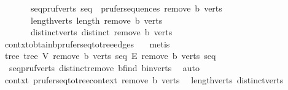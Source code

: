 \begin{isabellebody}
\ \ \ \ \ \ \ seq{\isacharunderscore}{\kern0pt}pruf{\isacharunderscore}{\kern0pt}verts{\isacharprime}{\kern0pt}{\isacharcolon}{\kern0pt}\ {\isachardoublequoteopen}seq\ {\isasymin}\ prufer{\isacharunderscore}{\kern0pt}sequences\ {\isacharparenleft}{\kern0pt}remove{}\ b\ verts{\isacharparenright}{\kern0pt}{\isachardoublequoteclose}\isanewline
\ \ \ \ \ \ \ length{\isacharunderscore}{\kern0pt}verts{\isacharprime}{\kern0pt}{\isacharcolon}{\kern0pt}\ {\isachardoublequoteopen}length\ {\isacharparenleft}{\kern0pt}remove{}\ b\ verts{\isacharparenright}{\kern0pt}\ {\isasymge}\ {}{\isachardoublequoteclose}\isanewline
\ \ \ \ \ \ \ distinct{\isacharunderscore}{\kern0pt}verts{\isacharprime}{\kern0pt}{\isacharcolon}{\kern0pt}\ {\isachardoublequoteopen}distinct\ {\isacharparenleft}{\kern0pt}remove{}\ b\ verts{\isacharparenright}{\kern0pt}{\isachardoublequoteclose}\isanewline
\ \ \ \ \isamarkupfalse%
\ contxt{\isachardot}{\kern0pt}obtain{\isacharunderscore}{\kern0pt}b{\isacharunderscore}{\kern0pt}prufer{\isacharunderscore}{\kern0pt}seq{\isacharunderscore}{\kern0pt}to{\isacharunderscore}{\kern0pt}tree{\isacharunderscore}{\kern0pt}edges\ {}\ \isamarkupfalse%
\ metis\isanewline
\ \ \isamarkupfalse%
\ \isamarkupfalse%
\ tree{\isacharprime}{\kern0pt}{\isacharcolon}{\kern0pt}\ tree\ {\isachardoublequoteopen}{\isacharquery}{\kern0pt}V\ {\isacharparenleft}{\kern0pt}remove{}\ b\ verts{\isacharparenright}{\kern0pt}\ seq{\isachardoublequoteclose}\ {\isachardoublequoteopen}{\isacharquery}{\kern0pt}E\ {\isacharparenleft}{\kern0pt}remove{}\ b\ verts{\isacharparenright}{\kern0pt}\ seq{\isachardoublequoteclose}\isanewline
\ \ \ \ \isamarkupfalse%
\ {}\ seq{\isacharunderscore}{\kern0pt}pruf{\isacharunderscore}{\kern0pt}verts{\isacharprime}{\kern0pt}\ distinct{\isacharunderscore}{\kern0pt}remove{}\ b{\isacharunderscore}{\kern0pt}find\ b{\isacharunderscore}{\kern0pt}in{\isacharunderscore}{\kern0pt}verts\ \isamarkupfalse%
\ auto\isanewline
\isanewline
\ \ \isamarkupfalse%
\ contxt{\isacharprime}{\kern0pt}{\isacharcolon}{\kern0pt}\ prufer{\isacharunderscore}{\kern0pt}seq{\isacharunderscore}{\kern0pt}to{\isacharunderscore}{\kern0pt}tree{\isacharunderscore}{\kern0pt}context\ {\isachardoublequoteopen}remove{}\ b\ verts{\isachardoublequoteclose}\ \isamarkupfalse%
\ length{\isacharunderscore}{\kern0pt}verts{\isacharprime}{\kern0pt}\ distinct{\isacharunderscore}{\kern0pt}verts{\isacharprime}{\kern0pt}\ \isamarkupfalse%

\end{isabellebody}
